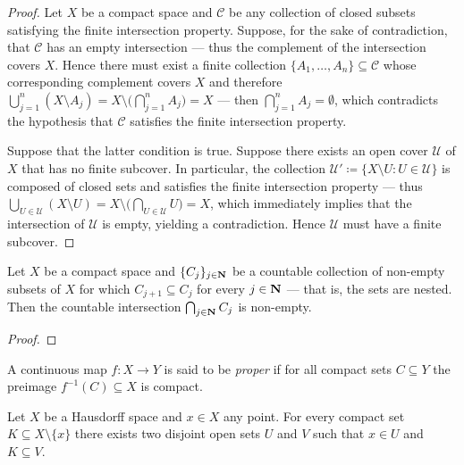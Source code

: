 \begin{proof}
Let \(X\) be a compact space and \(\mathcal{C}\) be any collection of closed
subsets satisfying the finite intersection property. Suppose, for the sake of
contradiction, that \(\mathcal{C}\) has an empty intersection --- thus the
complement of the intersection covers \(X\). Hence there must exist a finite
collection \(\{A_1, \dots, A_n\} \subseteq \mathcal{C}\) whose corresponding
complement covers \(X\) and therefore
\(\bigcup_{j=1}^n (X \setminus A_j) = X \setminus \big( \bigcap_{j=1}^n A_j \big)
= X\) --- then \(\bigcap_{j=1}^n A_j = \emptyset\), which contradicts the
hypothesis that \(\mathcal{C}\) satisfies the finite intersection property.

Suppose that the latter condition is true. Suppose there exists an open cover
\(\mathcal{U}\) of \(X\) that has no finite subcover. In particular, the
collection \(\mathcal{U}' \coloneq \{X \setminus U : U \in \mathcal{U}\}\) is
composed of closed sets and satisfies the finite intersection property --- thus
\(\bigcup_{U \in \mathcal{U}} (X \setminus U) = X \setminus \big( \bigcap_{U \in
  \mathcal{U}} U \big) = X\), which immediately implies that the intersection of
\(\mathcal{U}\) is empty, yielding a contradiction. Hence \(\mathcal{U}\) must
have a finite subcover.
\end{proof}

\begin{lemma}
\label{lem:cpct-countable-intersection-nested-non-empty}
Let \(X\) be a compact space and \(\{C_j\}_{j \in \mathbf{N}}\) be a countable
collection of non-empty subsets of \(X\) for which \(C_{j+1} \subseteq C_j\) for
every \(j \in \mathbf{N}\) --- that is, the sets are nested. Then the countable
intersection \(\bigcap_{j \in \mathbf{N}} C_j\) is non-empty.
\end{lemma}

\begin{proof}
\end{proof}

\begin{definition}
\label{def:proper-Top}
A continuous map \(f: X \to Y\) is said to be \emph{proper} if for all compact
sets \(C \subseteq Y\) the preimage \(f^{-1}(C) \subseteq X\) is compact.
\end{definition}

\begin{theorem}
\label{thm:hausdorff-compact-set-disjoint-neighbourhoods}
Let \(X\) be a Hausdorff space and \(x \in X\) any point. For every compact set
\(K \subseteq X \setminus \{x\}\) there exists two disjoint open sets \(U\) and
\(V\) such that \(x \in U\) and \(K \subseteq V\).
\end{theorem}

